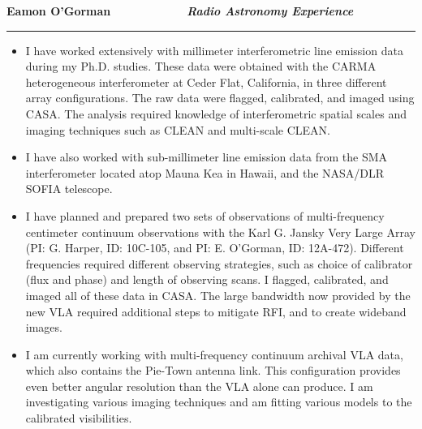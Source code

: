 \documentclass[11pt]{letter} %
\begin{document}

\longindentation=0pt                       %
\let\raggedleft\raggedright                %
 

\begin{flushleft}
{\large\bf Eamon O'Gorman \ \ \ \ \ \ \ \ \ \ \ \textit{Radio Astronomy Experience}}
\end{flushleft}
\medskip\hrule height 1pt
\begin{flushright}


\end{flushright} 

 \begin{itemize}

 
    \item I have worked extensively with millimeter interferometric line emission data during my Ph.D. studies. These data were obtained with the CARMA heterogeneous interferometer at Ceder Flat, California, in three different array configurations. The raw data were flagged, calibrated, and imaged using CASA. The analysis required knowledge of interferometric spatial scales and imaging techniques such as CLEAN and multi-scale CLEAN. \\
    
    \item I have also worked with sub-millimeter line emission data from the SMA interferometer located atop Mauna Kea in Hawaii, and the NASA/DLR SOFIA telescope. \\ 
    
    \item I have planned and prepared two sets of observations of multi-frequency centimeter continuum observations with the Karl G. Jansky Very Large Array (PI: G. Harper, ID: 10C-105, and PI: E. O'Gorman, ID: 12A-472). Different frequencies required different observing strategies, such as choice of calibrator (flux and phase) and length of observing scans. I flagged, calibrated, and imaged all of these data in CASA. The large bandwidth now provided by the new VLA required additional steps to mitigate RFI, and to create wideband images.\\ 
        
    \item I am currently working with multi-frequency continuum archival VLA data, which also contains the Pie-Town antenna link. This configuration provides even better angular resolution than the VLA alone can produce. I am investigating various imaging techniques and am fitting various models to the calibrated visibilities.\\ 
    

\end{itemize}
\end{document}
